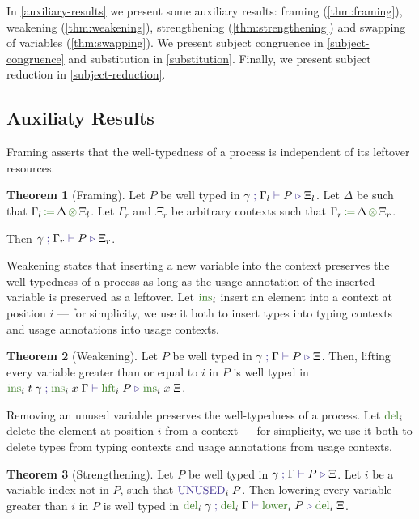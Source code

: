 \documentclass[a4paper,UKenglish,cleveref,autoref,thm-restate,authorcolumns]{lipics-v2019}
\theoremstyle{definition}
\newtheorem{nitheorem}{Theorem}
\newcommand{\type}[1]{\textcolor{BlueViolet}{\operatorname{#1}}}
\newcommand{\func}[1]{\textcolor{OliveGreen}{\operatorname{#1}}}
\newcommand{\opctx}[3]{#1 \, \func{\coloneqq} \, #2 \, \func{\otimes} \, #3}
\newcommand{\types}[4]{#1 \; \type{;} \; #2 \; \type{\vdash} \; #3 \; \type{\triangleright} \; #4}
\newcommand{\Unused}{\type{UNUSED}}
\begin{document}
In \autoref{auxiliary-results} we present some auxiliary results: framing (\autoref{thm:framing}), weakening (\autoref{thm:weakening}), strengthening (\autoref{thm:strengthening}) and swapping of variables (\autoref{thm:swapping}).
We present subject congruence in \autoref{subject-congruence} and substitution in \autoref{substitution}.
Finally, we present subject reduction in \autoref{subject-reduction}.

\subsection{Auxiliaty Results}
\label{auxiliary-results}
Framing asserts that the well-typedness of a process is independent of its leftover resources.
\begin{nitheorem}[Framing]
  \label{thm:framing}
  Let $P$ be well typed in $\types{\gamma}{\Gamma_l}{P}{\Xi_l}$.
  Let $\Delta$ be such that $\opctx{\Gamma_l}{\Delta}{\Xi_l}$.
  Let $\Gamma_r$ and $\Xi_r$ be arbitrary contexts such that $\opctx{\Gamma_r}{\Delta}{\Xi_r}$.

  Then $\types{\gamma}{\Gamma_r}{P}{\Xi_r}$.
\end{nitheorem}

Weakening states that inserting a new variable into the context preserves the well-typedness of a process as long as the usage annotation of the inserted variable is preserved as a leftover.
Let $\func{ins}_i$ insert an element into a context at position $i$ --- for simplicity, we use it both to insert types into typing contexts and usage annotations into usage contexts.
\begin{nitheorem}[Weakening]
  \label{thm:weakening}
  Let $P$ be well typed in $\types{\gamma}{\Gamma}{P}{\Xi}$.
  Then, lifting every variable greater than or equal to $i$ in $P$ is well typed in
  $\types{\func{ins}_i \; t \; \gamma}{\func{ins}_i \; x \; \Gamma}{\func{lift}_i \; P}{\func{ins}_i \; x \; \Xi}$.
\end{nitheorem}

Removing an unused variable preserves the well-typedness of a process.
Let $\func{del}_i$ delete the element at position $i$ from a context --- for simplicity, we use it both to delete types from typing contexts and usage annotations from usage contexts.
\begin{nitheorem}[Strengthening]
  \label{thm:strengthening} 
  Let $P$ be well typed in $\types{\gamma}{\Gamma}{P}{\Xi}$.
  Let $i$ be a variable index not in $P$, such that $\Unused_i \; P$.
  Then lowering every variable greater than $i$ in $P$ is well typed in $\types{\func{del}_i \; \gamma}{\func{del}_i \; \Gamma}{\func{lower}_i \; P}{\func{del}_i \; \Xi}$.
\end{nitheorem}
\end{document}
